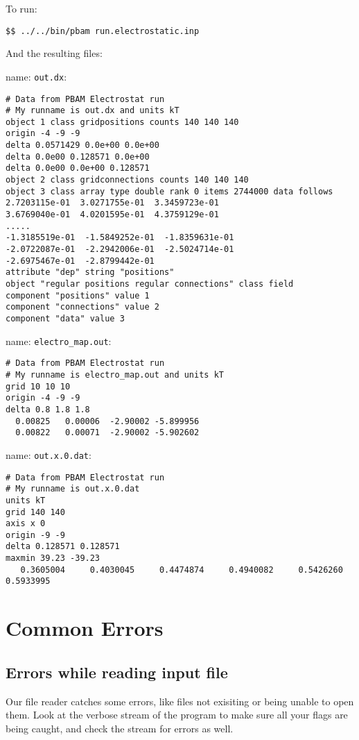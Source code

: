 To run: 
\begin{lstlisting}[style = MyBash]
$$ ../../bin/pbam run.electrostatic.inp
\end{lstlisting}
\medskip

And the resulting files: 

name: \texttt{out.dx}:
\begin{lstlisting}[style = MyBash]
# Data from PBAM Electrostat run
# My runname is out.dx and units kT
object 1 class gridpositions counts 140 140 140
origin -4 -9 -9
delta 0.0571429 0.0e+00 0.0e+00
delta 0.0e00 0.128571 0.0e+00
delta 0.0e00 0.0e+00 0.128571
object 2 class gridconnections counts 140 140 140
object 3 class array type double rank 0 items 2744000 data follows
2.7203115e-01  3.0271755e-01  3.3459723e-01  
3.6769040e-01  4.0201595e-01  4.3759129e-01 
.....
-1.3185519e-01  -1.5849252e-01  -1.8359631e-01
-2.0722087e-01  -2.2942006e-01  -2.5024714e-01
-2.6975467e-01  -2.8799442e-01
attribute "dep" string "positions"
object "regular positions regular connections" class field
component "positions" value 1
component "connections" value 2
component "data" value 3
\end{lstlisting}
\medskip

name: \texttt{electro\_map.out}:
\begin{lstlisting}[style = MyBash]
# Data from PBAM Electrostat run
# My runname is electro_map.out and units kT
grid 10 10 10
origin -4 -9 -9
delta 0.8 1.8 1.8
  0.00825   0.00006  -2.90002 -5.899956 
  0.00822   0.00071  -2.90002 -5.902602 
\end{lstlisting}
\medskip

name: \texttt{out.x.0.dat}:
\begin{lstlisting}[style = MyBash]
# Data from PBAM Electrostat run
# My runname is out.x.0.dat
units kT
grid 140 140 
axis x 0 
origin -9 -9
delta 0.128571 0.128571
maxmin 39.23 -39.23
   0.3605004     0.4030045     0.4474874     0.4940082     0.5426260     0.5933995
\end{lstlisting}


\chapter{Common Errors}

\section{Errors while reading input file}
Our file reader catches some errors, like files not exisiting or
being unable to open them. Look at the verbose stream of the
program to make sure all your flags are being caught, and check the
stream for errors as well.

